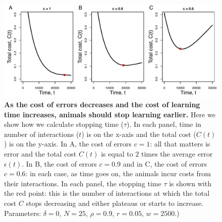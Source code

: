 \begin{figure}[ht]
\includegraphics[width=6.85in]{figures/stopping_time.pdf}
\caption{\sffamily\small\textbf{As the cost of errors decreases and the cost of learning time increases, animals should stop learning earlier.} Here we show how we calculate stopping time ($\tau$). In each panel, time in number of interactions ($t$) is on the x-axis and the total cost ($C(t)$) is on the y-axis. In A, the cost of errors $c=1$: all that matters is error and the total cost $C(t)$ is equal to $2$ times the average error $\epsilon(t)$. In B, the cost of errors $c=0.9$ and in C, the cost of errors $c=0.6$: in each case, as time goes on, the animals incur costs from their interactions. In each panel, the stopping time $\tau$ is shown with the red point: this is the number of interactions at which the total cost $C$ stops decreasing and either plateaus or starts to increase. Parameters: $\delta=0$, $N=25$, $\rho=0.9$, $r=0.05$, $w=2500$.)
}
\label{tau}
\end{figure}


